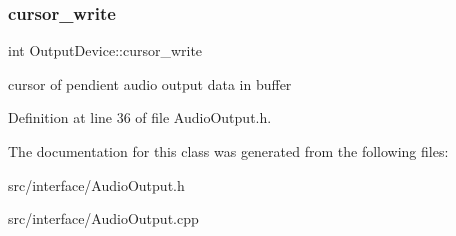 \subsubsection{\texorpdfstring{cursor\+\_\+write}{cursor\_write}}
{\footnotesize\ttfamily int Output\+Device\+::cursor\+\_\+write}

cursor of pendient audio output data in buffer 

Definition at line 36 of file Audio\+Output.\+h.



The documentation for this class was generated from the following files\+:\begin{DoxyCompactItemize}
\item 
src/interface/Audio\+Output.\+h\item 
src/interface/Audio\+Output.\+cpp\end{DoxyCompactItemize}
